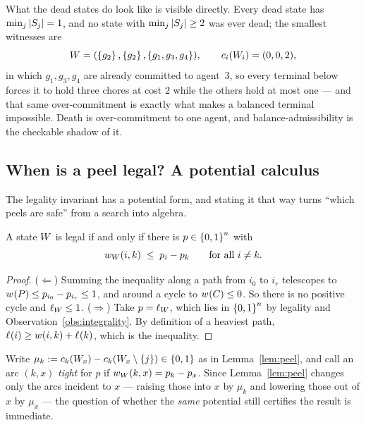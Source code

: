 What the dead states do look like is visible directly. Every dead state has
$\min_j \left\lvert S_j\right\rvert = 1$, and no state with $\min_j \left\lvert S_j\right\rvert \ge 2$ was ever dead;
the smallest witnesses are
\[
  W = (\left\{g_2\right\}, \left\{g_2\right\}, \left\{g_1,g_3,g_4\right\}),
  \qquad c_i(W_i) = (0,0,2),
\]
in which $g_1, g_3, g_4$ are already committed to agent~$3$, so every terminal
below forces it to hold three chores at cost $2$ while the others hold at most
one --- and that same over-commitment is exactly what makes a balanced terminal
impossible. Death is over-commitment to one agent, and balance-admissibility is
the checkable shadow of it.

\subsection{When is a peel legal? A potential calculus}
\label{sec:peel-calculus}

The legality invariant has a potential form, and stating it that way turns
``which peels are safe'' from a search into algebra.

\begin{lemma}
\label{lem:potential-form}
A state $W$ is legal if and only if there is $p \in \left\{0,1\right\}^n$ with
\[
  w_{W}(i,k) \;\le\; p_i - p_k \qquad \text{for all } i \ne k .
\]
\end{lemma}

\begin{proof}
($\Leftarrow$) Summing the inequality along a path from $i_0$ to $i_r$ telescopes
to $w_{}(P) \le p_{i_0} - p_{i_r} \le 1$, and around a cycle to
$w_{}(C) \le 0$. So there is no positive cycle and
$\ell_{W} \le 1$. ($\Rightarrow$) Take $p = \ell_{W}$,
which lies in $\left\{0,1\right\}^n$ by legality and
Observation~\ref{obs:integrality}. By definition of a heaviest path,
$\ell_{}(i) \ge w_{}(i,k) + \ell_{}(k)$, which is the inequality.
\end{proof}

Write $\mu_k := c_k(W_x) - c_k(W_x \setminus
\left\{j\right\}) \in \left\{0,1\right\}$ as in Lemma~\ref{lem:peel}, and call an arc $(k,x)$
\emph{tight} for $p$ if $w_{W}(k,x) = p_k - p_x$. Since
Lemma~\ref{lem:peel} changes only the arcs incident to $x$ --- raising those into
$x$ by $\mu_k$ and lowering those out of $x$ by $\mu_x$ --- the question of
whether the \emph{same} potential still certifies the result is immediate.

